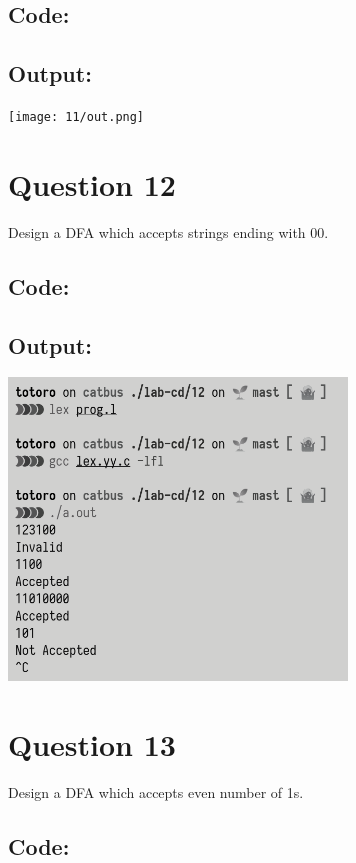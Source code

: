 \documentclass{article}
\begin{document}
\subsection*{Code:}

\newpage
\subsection*{Output:}
\begin{center}
  \texttt{[image: 11/out.png]}
\end{center}

\newpage
\section*{Question 12}
Design a DFA which accepts strings ending with 00.
\subsection*{Code:}

\newpage
\subsection*{Output:}
\begin{center}
  \includegraphics[width=9cm]{12/out.png}
\end{center}

\newpage
\section*{Question 13}
Design a DFA which accepts even number of 1s.
\subsection*{Code:}

\newpage
\end{document}
